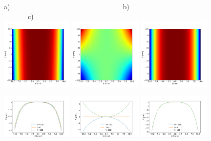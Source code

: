 \documentclass{iucr}              %
\begin{document}
\begin{figure}\label{fig:detrendedBeamline}
\flushleft
a)~~~~~~~~~~~~~~~~~~~~~~~~~~~~~~~~~b)~~~~~~~~~~~~~~~~~~~~~~~~~~~~~~c)\\
\centering
\includegraphics[width=0.32\textwidth]{figures/diaboloid_bl1222_detrended_image.png} 
\includegraphics[width=0.32\textwidth]{figures/linearizedparaboliccone_bl1222_detrended_image.png} 
\includegraphics[width=0.32\textwidth]{figures/ellipticalcylinder_bl1222_detrended_image.png} 

\includegraphics[width=0.32\textwidth]{figures/diaboloid_bl1222_detrended_profile.png}
\includegraphics[width=0.32\textwidth]{figures/linearizedparaboliccone_bl1222_detrended_profile.png}
\includegraphics[width=0.32\textwidth]{figures/ellipticalcylinder_bl1222_detrended_profile.png}


\end{figure}
\end{document}
